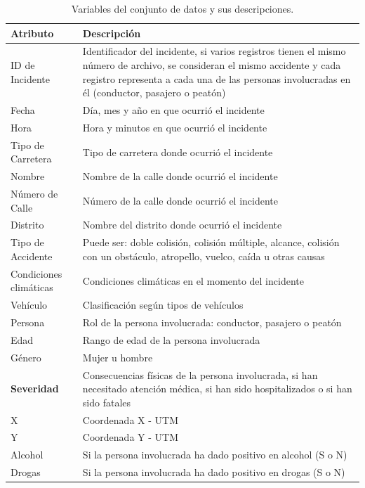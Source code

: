 \documentclass{uathesis-es}
\begin{document}
{	%
	\begin{table}[H]
		\begin{center}
			\begin{tabular}{|p{3cm}|p{12cm}|}
				\hline
				\textbf{Atributo} & \textbf{Descripción} \\ \hline \hline
				ID de Incidente  & Identificador del incidente, si varios registros tienen el mismo número de archivo, se consideran el mismo accidente y cada registro representa a cada una de las personas involucradas en él (conductor, pasajero o peatón)  \\ \hline
				Fecha  & Día, mes y año en que ocurrió el incidente \\ \hline
				Hora  & Hora y minutos en que ocurrió el incidente \\ \hline
				Tipo de Carretera & Tipo de carretera donde ocurrió el incidente \\ \hline
				Nombre & Nombre de la calle donde ocurrió el incidente \\ \hline
				Número de Calle & Número de la calle donde ocurrió el incidente  \\ \hline
				Distrito & Nombre del distrito donde ocurrió el incidente \\ \hline
				Tipo de Accidente  & Puede ser: doble colisión, colisión múltiple, alcance, colisión con un obstáculo, atropello, vuelco, caída u otras causas \\ \hline
				Condiciones climáticas  & Condiciones climáticas en el momento del incidente \\ \hline
				Vehículo  & Clasificación según tipos de vehículos \\ \hline
				Persona  & Rol de la persona involucrada: conductor, pasajero o peatón \\ \hline
				Edad  & Rango de edad de la persona involucrada \\ \hline
				Género  & Mujer u hombre \\ \hline
				\textbf{Severidad}  & Consecuencias físicas de la persona involucrada, si han necesitado atención médica, si han sido hospitalizados o si han sido fatales \\ \hline
				X   & Coordenada X - UTM \\ \hline
				Y   & Coordenada Y - UTM \\ \hline
				Alcohol & Si la persona involucrada ha dado positivo en alcohol (S o N) \\ \hline
				Drogas & Si la persona involucrada ha dado positivo en drogas (S o N) \\ \hline \hline
			\end{tabular}
		\end{center}
		\caption{Variables del conjunto de datos y sus descripciones.}
		\label{Datadescription}
	\end{table}
	
}
\end{document}
